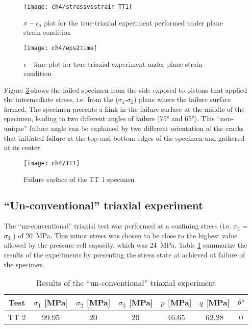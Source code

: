 \begin{figure}[tb]
    \centering
    \texttt{[image: ch4/stressvsstrain\_TT1]}
    \caption{$\sigma-\epsilon_a$ plot for the true-triaxial experiment performed under plane strain condition}
    \label{fig4:10}
\end{figure} 


\begin{figure}[tb]
    \centering
    \texttt{[image: ch4/eps2time]}
    \caption{$\epsilon$ - time plot for true-triaxial experiment under plane strain condition}
    \label{fig4:11}
\end{figure} 

Figure \ref{fig4:12} shows the failed specimen from the side exposed to pistons that applied the intermediate stress, i.e. from the ($\sigma_3$-$\sigma_2$) plane where the failure surface formed. The specimen presents a kink in the failure surface at the middle of the specimen, leading to two different angles of failure (\ang{75} and \ang{65}). This “non-unique” failure angle can be explained by two different orientation of the cracks that initiated failure at the top and bottom edges of the specimen and gathered at its center. 

\begin{figure}[tb]
    \centering
    \texttt{[image: ch4/TT1]}
    \caption{Failure surface of the TT 1 specimen}
    \label{fig4:12}
\end{figure} 

\subsection{“Un-conventional” triaxial experiment }

The “un-conventional” triaxial test was performed at a confining stress (i.e. $\sigma_2$ = $\sigma_3$ ) of \SI{20}{MPa}. This minor stress was chosen to be close to the highest value allowed by the pressure cell capacity, which was \SI{24}{MPa}. Table \ref{tb4:TT2} summarize the results of the experiments by presenting the stress state at achieved at failure of the specimen. 

\begin{table}
    \centering
    \begin{tabular}{ccccccc}
        \hline
        Test & $\sigma_1$ [\si{MPa}] & $\sigma_2$ [\si{MPa}] & $\sigma_3$ [\si{MPa}] & $p$ [\si{MPa}] & $q$ [\si{MPa}] & $\theta \si{\degree}$ \\
        \hline
        \hline
        TT 2 & 99.95 & 20 & 20 & 46.65 & 62.28 & 0\\
        \hline
    \end{tabular}
    \caption{Results of the “un-conventional” triaxial experiment }
    \label{tb4:TT2}
\end{table}


